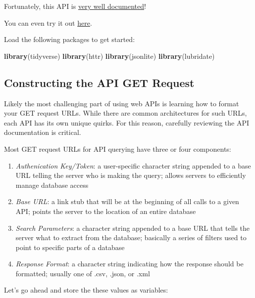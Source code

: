 \documentclass[]{book}
\newenvironment{Shaded}{\begin{snugshade}}{\end{snugshade}}
\newcommand{\KeywordTok}[1]{\textcolor[rgb]{0.13,0.29,0.53}{\textbf{#1}}}
\newcommand{\NormalTok}[1]{#1}
\begin{document}
Fortunately, this API is
\href{https://developer.nytimes.com/docs/articlesearch-product/1/overview}{very
well documented}!

You can even try it out
\href{http://developer.nytimes.com/io-docs}{here}.

Load the following packages to get started:

\begin{Shaded}
\begin{Highlighting}[]
\KeywordTok{library}\NormalTok{(tidyverse)}
\KeywordTok{library}\NormalTok{(httr)}
\KeywordTok{library}\NormalTok{(jsonlite)}
\KeywordTok{library}\NormalTok{(lubridate)}
\end{Highlighting}
\end{Shaded}

\subsection{Constructing the API GET
Request}\label{constructing-the-api-get-request}

Likely the most challenging part of using web APIs is learning how to
format your GET request URLs. While there are common architectures for
such URLs, each API has its own unique quirks. For this reason,
carefully reviewing the API documentation is critical.

Most GET request URLs for API querying have three or four components:

\begin{enumerate}
\def\labelenumi{\arabic{enumi}.}
\item
  \emph{Authenication Key/Token}: a user-specific character string
  appended to a base URL telling the server who is making the query;
  allows servers to efficiently manage database access
\item
  \emph{Base URL}: a link stub that will be at the beginning of all
  calls to a given API; points the server to the location of an entire
  database
\item
  \emph{Search Parameters}: a character string appended to a base URL
  that tells the server what to extract from the database; basically a
  series of filters used to point to specific parts of a database
\item
  \emph{Response Format}: a character string indicating how the response
  should be formatted; usually one of .csv, .json, or .xml
\end{enumerate}

Let's go ahead and store the these values as variables:
\end{document}
